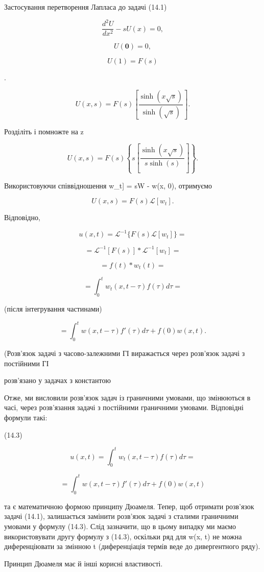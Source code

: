 \documentclass[
  ukrainian,
]{article}
\begin{document}
Застосування перетворення Лапласа до задачі (14.1)

\[
\frac{d^2U}{dx^2} - sU(x) = 0,
\]

\[
U\left( \mathbf{0}\right) =0,
\]

\[
U(1) = F(s)
\]

.

\[
U(x, s) = F(s) \left[ \frac{\sinh(x \sqrt{s})}{\sinh(\sqrt{s})} \right].
\]

Розділіть і помножте на z

\[
U(x, s) = F(s) \left\{ s \left[ \frac{\sinh(x \sqrt{s})}{s \sinh(s)} \right] \right\}.
\]

Використовуючи співвідношення \mathscr{L}{[}w\_t{]} = sW - w(x, 0),
отримуємо

\[
U(x, s) = F(s) \mathcal{L}[w_t].
\]

Відповідно,

\[
u(x, t) = \mathcal{L}^{-1} \{ F(s) \mathcal{L}[w_t] \} =
\]

\[
= \mathcal{L}^{-1} [ F(s) ] * \mathcal{L}^{-1}[w_t] =
\]

\[
= f(t) * w_t(t) =
\]

\[
= \int_0^t w_t(x, t-\tau) f(\tau) d\tau =
\]

(після інтегрування частинами)

\[
= \int_{0}^{t} w(x, t-\tau) f'(\tau) d\tau + f(0) w(x, t).
\]

(Розв'язок задачі з часово-залежними ГІ виражається через розв'язок
задачі з постійними ГІ

розв'язано у задачах з константою

Отже, ми висловили розв'язок задач із граничними умовами, що змінюються
в часі, через розв'язання задачі з постійними граничними умовами.
Відповідні формули такі:

(14.3)

\[
u(x, t) = \int_{0}^{t} w_{t}(x, t - \tau) f(\tau) d\tau =
\]

\[
= \int_{0}^{t} w(x, t - \tau) f'(\tau) d\tau + f(0) w(x, t)
\]

та є математичною формою принципу Дюамеля. Тепер, щоб отримати розв'язок
задачі (14.1), залишається замінити розв'язок задачі з сталими
граничними умовами у формулу (14.3). Слід зазначити, що в цьому випадку
ми маємо використовувати другу формулу з (14.3), оскільки ряд для w(x,
t) не можна диференціювати за змінною t (диференціація термів веде до
дивергентного ряду).

Принцип Дюамеля має й інші корисні властивості.
\end{document}
